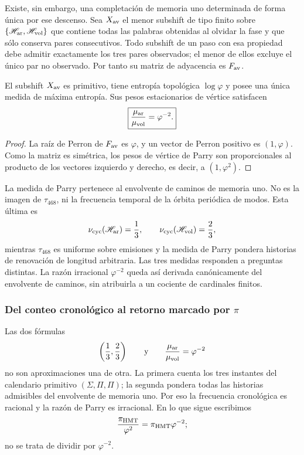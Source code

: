 Existe, sin embargo, una completación de memoria uno determinada de forma
única por ese descenso. Sea \(X_{\rm av}\) el menor subshift de tipo finito
sobre
\(\{\mathscr H_{\rm ar},\mathscr H_{\rm vol}\}\) que contiene todas las
palabras obtenidas al olvidar la fase y que sólo conserva pares consecutivos.
Todo subshift de un paso con esa propiedad debe admitir exactamente los tres
pares observados; el menor de ellos excluye el único par no observado. Por
tanto su matriz de adyacencia es \(F_{\rm av}\).

\begin{corollary}
\label{cor:parry-envolvente-fav}
El subshift \(X_{\rm av}\) es primitivo, tiene entropía topológica
\(\log\varphi\) y posee una única medida de máxima entropía. Sus pesos
estacionarios de vértice satisfacen
\[
 \boxed{
 \frac{\mu_{\rm ar}}{\mu_{\rm vol}}=\varphi^{-2}.}
\]
\end{corollary}

\begin{proof}
La raíz de Perron de \(F_{\rm av}\) es \(\varphi\), y un vector de Perron
positivo es \((1,\varphi)\). Como la matriz es simétrica, los pesos de vértice
de Parry son proporcionales al producto de los vectores izquierdo y derecho,
es decir, a \((1,\varphi^2)\).
\end{proof}

La medida de Parry pertenece al envolvente de caminos de memoria uno. No es
la imagen de \(\tau_{468}\), ni la frecuencia temporal de la órbita periódica
de modos. Esta última es
\[
 \nu_{\rm cyc}(\mathscr H_{\rm ar})=\frac13,\qquad
 \nu_{\rm cyc}(\mathscr H_{\rm vol})=\frac23,
\]
mientras \(\tau_{468}\) es uniforme sobre emisiones y la medida de Parry
pondera historias de renovación de longitud arbitraria. Las tres medidas
responden a preguntas distintas. La razón irracional
\(\varphi^{-2}\) queda así derivada canónicamente del envolvente de caminos,
sin atribuirla a un cociente de cardinales finitos.

\subsubsection{Del conteo cronológico al retorno marcado por \texorpdfstring{\(\pi\)}{π}}
\label{sec:retorno-marcado-pi-phi2}

Las dos fórmulas
\[
 \left(\frac13,\frac23\right)
 \qquad\text{y}\qquad
 \frac{\mu_{\rm ar}}{\mu_{\rm vol}}=\varphi^{-2}
\]
no son aproximaciones una de otra. La primera cuenta los tres instantes del
calendario primitivo \((\Sigma,\Pi,\Pi)\); la segunda pondera todas las
historias admisibles del envolvente de memoria uno. Por eso la frecuencia
cronológica es racional y la razón de Parry es irracional. En lo que sigue
escribimos
\[
 \frac{\pi_{\rm HMT}}{\varphi^2}
 =\pi_{\rm HMT}\varphi^{-2};
\]
no se trata de dividir por \(\varphi^{-2}\).


